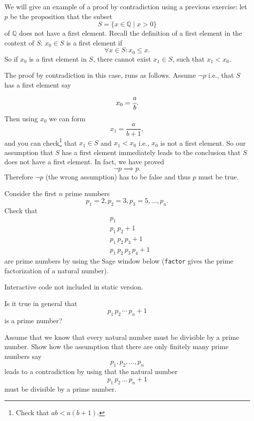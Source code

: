 \begin{example}
  We will give an example of a proof by contradiction using a previous exercise: let $p$
  be the proposition that
  the subset
  $$
    S = \{x\in \mathbb{Q} \mid x > 0\}
  $$
  of $\mathbb{Q}$
  does not have a first element. Recall the definition of a first element in
  the context of $S$: $x_0\in S$ is a first element if
  $$
    \forall x\in S: x_0 \leq x.
  $$
  So if $x_0$ is a first element in $S$, there cannot exist $x_1\in S$, such that
  $x_1 < x_0$.

  The proof by contradiction  in this case, runs as follows. Assume $\neg p$ i.e., that $S$
  has a first element say
  $$
    x_0 = \cfrac{a}{b}.
  $$
  Then using $x_0$ we can form
  $$
    x_1 = \frac{a}{b+1},
  $$
  and you can check\footnote{Check that $a b < a(b+1)$.} that $x_1\in S$ and $x_1 < x_0$ i.e., $x_0$ is not a first
  element. So our assumption that $S$ has a first element immediately leads
  to the conclusion that $S$ does not have a first element. In fact, we have proved
  $$
    \neg p \implies p.
  $$
  Therefore $\neg p$ (the wrong assumption)
  has to be false and thus $p$ must be true.
\end{example}

\begin{exercise}\label{exprimeinfinite}
  Consider the first $n$ prime numbers
  $$
    p_1 = 2, p_2 = 3, p_3 = 5, \dots, p_n.
  $$
  Check that
  \begin{align*}
     & p_1                       \\
     & p_1\, p_2 + 1             \\
     & p_1\, p_2\, p_3 + 1       \\
     & p_1\, p_2\, p_3\, p_4 + 1
  \end{align*}
  are prime numbers by using the Sage window below (\texttt{factor} gives
  the prime factorization of a natural number).

  \begin{sage} Interactive code not included in static version.\end{sage}

  Is it true in general that
  $$
    p_1\, p_2\, \cdots \, p_n + 1
  $$
  is a prime number?

  Assume that we know that every natural number must be divisible by a prime number. Show how the
  assumption that there are only finitely many prime numbers say
  $$
    p_1, p_2, \dots, p_n
  $$
  leads to a contradiction by using that the natural number
  $$
    p_1\, p_2\, \dots\, p_n + 1
  $$
  must be divisible by a prime number.
\end{exercise}

